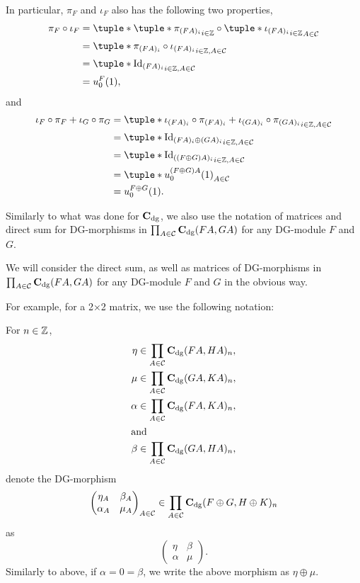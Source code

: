 \begin{remark}
    In particular, \( \pi_F \) and \( \iota_F \) also has the following two properties,
    \begin{align*}
        \pi_F \circ \iota_F &= \tuple*{ \tuple*{ \pi_{(F A)_i} }_{i \in \Zb} \circ \tuple*{ \iota_{(F A)_i} }_{i \in \Zb} }_{A \in \Cc} \\
        &= \tuple*{ \pi_{(F A)_i} \circ \iota_{(F A)_i} }_{i \in \Zb, A \in \Cc} \\
        &= \tuple*{ \Id_{(F A)_i} }_{i \in \Zb, A \in \Cc} \\
        &= u_0^F(1),
    \end{align*}
    and
    \begin{align*}
        \iota_F \circ \pi_F + \iota_G \circ \pi_G &= \tuple*{\iota_{(F A)_i} \circ \pi_{(F A)_i} + \iota_{(G A)_i} \circ \pi_{(G A)_i} }_{i \in \Zb, A \in \Cc} \\
        &= \tuple*{ \Id_{(F A)_i \oplus (G A)_i} }_{i \in \Zb, A \in \Cc} \\
        &= \tuple*{ \Id_{((F \oplus G) A)_i} }_{i \in \Zb, A \in \Cc} \\
        &= \tuple*{ u_0^{(F \oplus G) A} (1)}_{A \in \Cc} \\
        &= u_0^{F \oplus G} (1).
    \end{align*}
\end{remark}

Similarly to what was done for \( \operatorname{\mathbf{C}}_{\operatorname{dg}} \), we also use the notation of matrices and direct sum for DG-morphisms in \( \prod_{A \in {\mathcal{C}}} \operatorname{\mathbf{C}}_{\operatorname{dg}} (F A, G A) \) for any DG-module \( F \) and \( G \).
\begin{notation}
    We will consider the direct sum, as well as matrices of DG-morphisms in \( \prod_{A \in {\mathcal{C}}} \operatorname{\mathbf{C}}_{\operatorname{dg}} (F A, G A) \) for any DG-module \( F \) and \( G \) in the obvious way.

    For example, for a 2×2 matrix, we use the following notation:

    For \( n \in {\mathbb{Z}} \),
    \begin{align*}
        \eta &\in \prod_{A \in {\mathcal{C}}} \operatorname{\mathbf{C}}_{\operatorname{dg}}(F A, H A)_n, \\
        \mu &\in \prod_{A \in {\mathcal{C}}} \operatorname{\mathbf{C}}_{\operatorname{dg}}(G A, K A)_n, \\
        \alpha &\in \prod_{A \in {\mathcal{C}}} \operatorname{\mathbf{C}}_{\operatorname{dg}}(F A, K A)_n, \\
        \intertext{and}
        \beta &\in \prod_{A \in {\mathcal{C}}} \operatorname{\mathbf{C}}_{\operatorname{dg}}(G A, H A)_n,
    \end{align*}
    denote the DG-morphism
    \[
        \begin{pmatrix}
            \eta_A & \beta_A \\
            \alpha_A & \mu_A
        \end{pmatrix}_{A \in {\mathcal{C}}}
        \in
        \prod_{A \in {\mathcal{C}}} \operatorname{\mathbf{C}}_{\operatorname{dg}}(F \oplus G, H \oplus K)_n
    \]
    as
    \[
        \begin{pmatrix}
            \eta & \beta \\
            \alpha & \mu
        \end{pmatrix}.
    \]
    Similarly to above, if \( \alpha = 0 = \beta \), we write the above morphism as \( \eta \oplus \mu \).
\end{notation}

